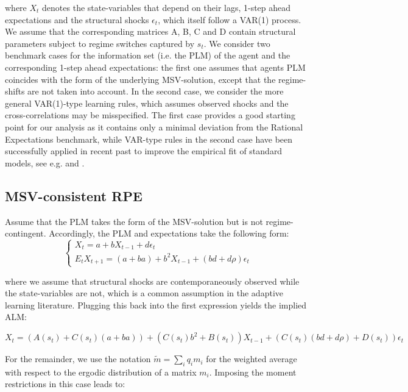 \documentclass[12pt,reqno]{article}
\numberwithin{equation}{section}
\begin{document}
where $X_t $ denotes the state-variables that depend on their lags, 1-step ahead expectations and the structural shocks $\epsilon_t$, which itself follow a VAR(1) process. We assume that the corresponding matrices A, B, C and D contain structural parameters subject to regime switches captured by $s_t$.  We consider two benchmark cases for the information set (i.e. the PLM) of the agent and the corresponding 1-step ahead expectations: the first one assumes that agents PLM coincides with the form of the underlying MSV-solution, except that the regime-shifts are not taken into account. In the second case, we consider the more general VAR(1)-type learning rules, which assumes observed shocks and the cross-correlations may be misspecified.  The first case provides a good starting point for our analysis as it contains only a minimal deviation from the Rational Expectations benchmark, while VAR-type rules in the second case have been successfully applied in recent past to improve the empirical fit of standard models, see e.g. \cite{slobodyan2012alearning} and \cite{christopher2018learning}. 

\subsection{MSV-consistent RPE} 

Assume that the PLM takes the form of the MSV-solution but is not regime-contingent. Accordingly, the PLM and expectations take the following form: \\

$$
\begin{cases}
X_t = a + b X_{t-1} + d \epsilon_t \\
E_t X_{t+1} = (a+ba) + b^2 X_{t-1} + (bd + d\rho) \epsilon_t 
\end{cases}
$$

where we assume that structural shocks are contemporaneously observed while the state-variables are not, which is a common assumption in the adaptive learning literature. Plugging this back into the first expression yields the implied ALM: 


$$
X_t = ( A(s_t) + C(s_t) (a+ba) ) + (C(s_t) b^2 + B(s_t))X_{t-1} + ( C(s_t) (bd +d \rho ) + D(s_t) ) \epsilon_t 
$$

For the remainder, we use the notation $\tilde{m} = \sum_i q_i m_i $ for the weighted average with respect to the ergodic distribution of a matrix $m_i $. Imposing the moment restrictions in this case leads to: \\
\end{document}
